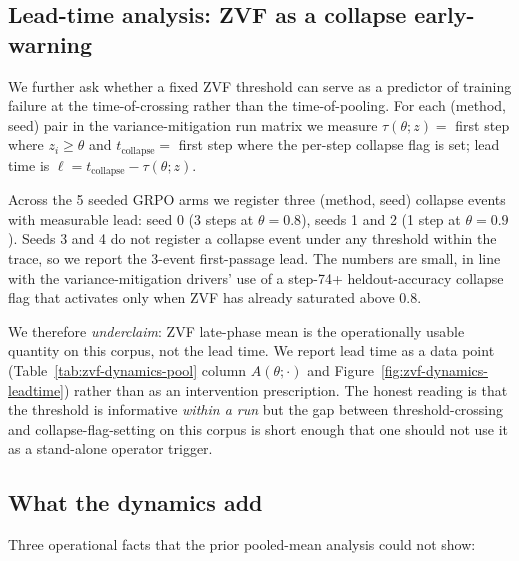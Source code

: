 \subsection{Lead-time analysis: ZVF as a collapse early-warning}

We further ask whether a fixed ZVF threshold can serve as a
predictor of training failure at the time-of-crossing rather than
the time-of-pooling. For each (method, seed) pair in the
variance-mitigation run matrix we measure
$\tau(\theta; z) = $ first step where $z_i \ge \theta$ and
$t_{\text{collapse}} = $ first step where the per-step collapse flag
is set; lead time is $\ell = t_{\text{collapse}} - \tau(\theta; z)$.

Across the 5 seeded GRPO arms we register three (method, seed)
collapse events with measurable lead: seed 0 (3 steps at $\theta=0.8$),
seeds 1 and 2 (1 step at $\theta=0.9$). Seeds 3 and 4 do not register
a collapse event under any threshold within the trace, so we report
the 3-event first-passage lead. The numbers are small, in line with
the variance-mitigation drivers' use of a step-74+ heldout-accuracy
collapse flag that activates only when ZVF has already saturated
above 0.8.

We therefore \emph{underclaim}: ZVF late-phase mean is the
operationally usable quantity on this corpus, not the lead time. We
report lead time as a data point (Table~\ref{tab:zvf-dynamics-pool}
column $A(\theta;\cdot)$ and Figure~\ref{fig:zvf-dynamics-leadtime})
rather than as an intervention prescription. The honest reading is
that the threshold is informative \emph{within a run} but the
gap between threshold-crossing and collapse-flag-setting on this
corpus is short enough that one should not use it as a stand-alone
operator trigger.

\subsection{What the dynamics add}

Three operational facts that the prior pooled-mean analysis could
not show:

